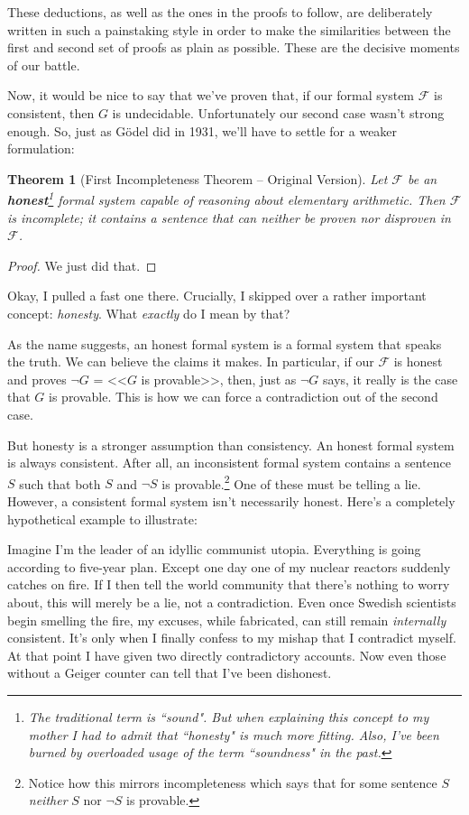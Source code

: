 \documentclass{article}
\theoremstyle{theorem}
\newtheorem{theorem}{Theorem}
\begin{document}
These deductions, as well as the ones in the proofs to follow, are deliberately written in such a painstaking style in order to make the similarities between the first and second set of proofs as plain as possible. These are the decisive moments of our battle.

Now, it would be nice to say that we've proven that, if our formal system $\mathcal{F}$ is consistent, then $G$ is undecidable. Unfortunately our second case wasn't strong enough. So, just as Gödel did in 1931, we'll have to settle for a weaker formulation:

\begin{theorem}[First Incompleteness Theorem -- Original Version]
Let $\mathcal{F}$ be an \textbf{honest}\footnote{The traditional term is ``\textit{sound}". But when explaining this concept to my mother I had to admit that ``honesty" is much more fitting. Also, I've been burned by overloaded usage of the term ``soundness" in the past.} formal system capable of reasoning about elementary arithmetic. Then $\mathcal{F}$ is incomplete; it contains a sentence that can neither be proven nor disproven in $\mathcal{F}$.
\end{theorem}

\begin{proof}
We just did that.
\end{proof}

Okay, I pulled a fast one there. Crucially, I skipped over a rather important concept: \textit{honesty}. What \textit{exactly} do I mean by that?

As the name suggests, an honest formal system is a formal system that speaks the truth. We can believe the claims it makes. In particular, if our $\mathcal{F}$ is honest and proves $\neg G$ = <<$G$ is provable>>, then, just as $\neg G$ says, it really is the case that $G$ is provable. This is how we can force a contradiction out of the second case.

But honesty is a stronger assumption than consistency. An honest formal system is always consistent. After all, an inconsistent formal system contains a sentence $S$ such that both $S$ and $\neg S$ is provable.\footnote{Notice how this mirrors incompleteness which says that for some sentence $S$ \textit{neither} $S$ nor $\neg S$ is provable.} One of these must be telling a lie. However, a consistent formal system isn't necessarily honest. Here's a completely hypothetical example to illustrate: 

Imagine I'm the leader of an idyllic communist utopia. Everything is going according to five-year plan. Except one day one of my nuclear reactors suddenly catches on fire. If I then tell the world community that there's nothing to worry about, this will merely be a lie, not a contradiction. Even once Swedish scientists begin smelling the fire, my excuses, while fabricated, can still remain \textit{internally} consistent. It's only when I finally confess to my mishap that I contradict myself. At that point I have given two directly contradictory accounts. Now even those without a Geiger counter can tell that I've been dishonest.
\end{document}
